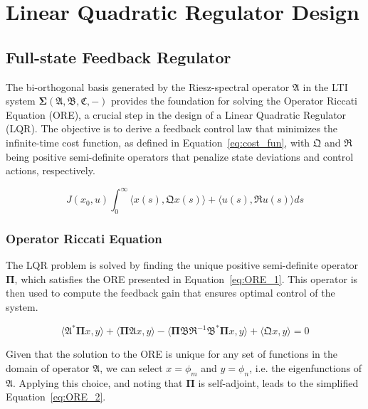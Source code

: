 \section{Linear Quadratic Regulator Design}

\subsection{Full-state Feedback Regulator}

The bi-orthogonal basis generated by the Riesz-spectral operator $\mathfrak{A}$ in the LTI system $\mathbf{\Sigma(\mathfrak{A},\mathfrak{B},\mathfrak{C},-)}$ provides the foundation for solving the Operator Riccati Equation (ORE), a crucial step in the design of a Linear Quadratic Regulator (LQR). The objective is to derive a feedback control law that minimizes the infinite-time cost function, as defined in Equation~\ref{eq:cost_fun}, with $\mathfrak{Q}$ and $\mathfrak{R}$ being positive semi-definite operators that penalize state deviations and control actions, respectively.

\begin{equation} \label{eq:cost_fun}
    J(x_0, u) \int_0^{\infty} \langle x(s), \mathfrak{Q} x(s)\rangle + \langle u(s), \mathfrak{R} u(s)\rangle ds
\end{equation}

\subsubsection{Operator Riccati Equation}

The LQR problem is solved by finding the unique positive semi-definite operator $\mathbf{\Pi}$, which satisfies the ORE presented in Equation~\ref{eq:ORE_1}. This operator is then used to compute the feedback gain that ensures optimal control of the system.

\begin{equation} \label{eq:ORE_1}
    \langle \mathfrak{A}^* \mathbf{\Pi} x, y\rangle + \langle \mathbf{\Pi} \mathfrak{A} x, y \rangle - \langle \mathbf{\Pi} \mathfrak{B} \mathfrak{R}^{-1} \mathfrak{B}^* \mathbf{\Pi} x, y\rangle + \langle \mathfrak{Q} x, y\rangle = 0
\end{equation}

Given that the solution to the ORE is unique for any set of functions in the domain of operator $\mathfrak{A}$, we can select $x = \phi_m$ and $y = \phi_n$, i.e. the eigenfunctions of $\mathfrak{A}$. Applying this choice, and noting that $\mathbf{\Pi}$ is self-adjoint, leads to the simplified Equation~\ref{eq:ORE_2}.

